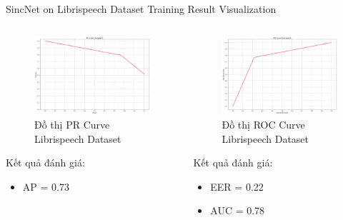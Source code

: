 \documentclass[notheorems, aspectratio=54]{beamer}
\begin{document}
\begin{frame}{SincNet on Librispeech Dataset Training Result Visualization}
	\begin{columns}
		\begin{column}{0.47\textwidth}
			\begin{figure}[H]
				\includegraphics[width=0.9\linewidth]{result/pr_curve_librispeech.png}
				\caption{Đồ thị PR Curve Librispeech Dataset}
			\end{figure}
			Kết quả đánh giá:
			\begin{itemize}
				\item AP = 0.73
			\end{itemize}
		\end{column}
		\begin{column}{0.5\textwidth}
			\begin{figure}[H]
				\includegraphics[width=0.9\linewidth]{result/roc_curve_librispeech.png}
				\caption{Đồ thị ROC Curve Librispeech Dataset}
			\end{figure}
			Kết quả đánh giá:
			\begin{itemize}
				\item EER = 0.22
				\item AUC = 0.78
			\end{itemize}
		\end{column}
	\end{columns}
\end{frame}
\end{document}
